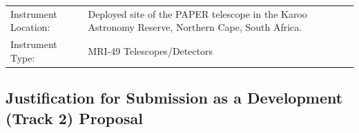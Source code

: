 \documentclass[preprint]{aastex}
\begin{document}


\begin{table}[ht]
\begin{tabular}{lp{4 in}}
Instrument Location: & Deployed site of the PAPER 
telescope in the Karoo Astronomy Reserve, Northern Cape, South Africa. \\
Instrument Type: & MRI-49 Telescopes/Detectors \\
\end{tabular}
\end{table}

\vspace{-0.35in}
\subsection{Justification for Submission as a Development (Track 2) Proposal}
\vspace{-6pt}
\end{document}
